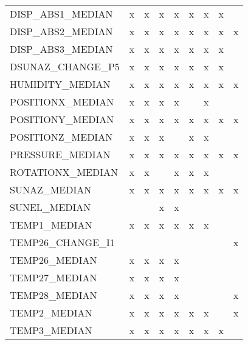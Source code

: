 \begin{longtable}{lllllllll}
      DISP\_ABS1\_MEDIAN &      x &      x &      x &      x &      x &      x &      x &        \\
      DISP\_ABS2\_MEDIAN &      x &      x &      x &      x &      x &      x &      x &      x \\
      DISP\_ABS3\_MEDIAN &      x &      x &      x &      x &      x &      x &      x &        \\
      DSUNAZ\_CHANGE\_P5 &      x &      x &      x &      x &      x &      x &      x &        \\
       HUMIDITY\_MEDIAN &      x &      x &      x &      x &      x &      x &      x &      x \\
      POSITIONX\_MEDIAN &      x &      x &      x &      x &        &      x &        &        \\
      POSITIONY\_MEDIAN &      x &      x &      x &      x &      x &      x &      x &      x \\
      POSITIONZ\_MEDIAN &      x &      x &      x &        &      x &      x &        &        \\
       PRESSURE\_MEDIAN &      x &      x &      x &      x &      x &      x &      x &      x \\
      ROTATIONX\_MEDIAN &      x &      x &        &      x &      x &      x &        &        \\
          SUNAZ\_MEDIAN &      x &      x &      x &      x &      x &      x &      x &      x \\
          SUNEL\_MEDIAN &        &        &      x &      x &        &        &        &        \\
          TEMP1\_MEDIAN &      x &      x &      x &      x &      x &      x &        &        \\
      TEMP26\_CHANGE\_I1 &        &        &        &        &        &        &        &      x \\
         TEMP26\_MEDIAN &      x &      x &      x &      x &        &        &        &        \\
         TEMP27\_MEDIAN &      x &      x &      x &      x &        &        &        &        \\
         TEMP28\_MEDIAN &      x &      x &      x &      x &        &        &        &      x \\
          TEMP2\_MEDIAN &      x &      x &      x &      x &      x &      x &        &      x \\
          TEMP3\_MEDIAN &      x &      x &      x &      x &      x &      x &      x &        \\

\end{longtable}
